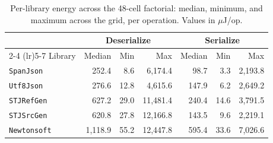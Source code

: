 \begin{table}[ht]
  \centering
  \caption{Per-library energy across the 48-cell factorial: median, minimum, and maximum across the grid, per operation. Values in $\mu$J/op.}
  \label{tab:factorial-energy-summary}
  \begin{tabular}{lrrrrrr}
    \toprule
    & \multicolumn{3}{c}{Deserialize} & \multicolumn{3}{c}{Serialize} \\
    \cmidrule(lr){2-4} \cmidrule(lr){5-7}
    Library & Median & Min & Max & Median & Min & Max \\
    \midrule
    \texttt{SpanJson} & 252.4 & 8.6 & 6,174.4 & 98.7 & 3.3 & 2,193.8 \\
    \texttt{Utf8Json} & 276.6 & 12.8 & 4,615.6 & 147.9 & 6.2 & 2,649.2 \\
    \texttt{STJRefGen} & 627.2 & 29.0 & 11,481.4 & 240.4 & 14.6 & 3,791.5 \\
    \texttt{STJSrcGen} & 620.8 & 27.8 & 12,166.8 & 143.5 & 9.6 & 2,219.1 \\
    \texttt{Newtonsoft} & 1,118.9 & 55.2 & 12,447.8 & 595.4 & 33.6 & 7,026.6 \\
    \bottomrule
  \end{tabular}
\end{table}
